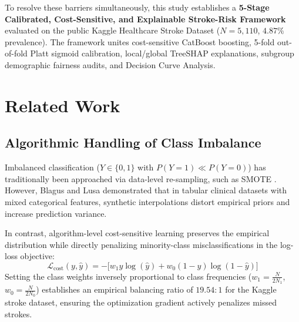 \documentclass[conference]{IEEEtran}
\begin{document}
To resolve these barriers simultaneously, this study establishes a \textbf{5-Stage Calibrated, Cost-Sensitive, and Explainable Stroke-Risk Framework} evaluated on the public Kaggle Healthcare Stroke Dataset ($N = 5,110$, $4.87\%$ prevalence). The framework unites cost-sensitive CatBoost boosting, 5-fold out-of-fold Platt sigmoid calibration, local/global TreeSHAP explanations, subgroup demographic fairness audits, and Decision Curve Analysis.

\section{Related Work}

\subsection{Algorithmic Handling of Class Imbalance}
Imbalanced classification ($Y \in \{0, 1\}$ with $P(Y=1) \ll P(Y=0)$) has traditionally been approached via data-level re-sampling, such as SMOTE \cite{chawla2002smote}. However, Blagus and Lusa \cite{blagus2013smote} demonstrated that in tabular clinical datasets with mixed categorical features, synthetic interpolations distort empirical priors and increase prediction variance.

In contrast, algorithm-level cost-sensitive learning preserves the empirical distribution while directly penalizing minority-class misclassifications in the log-loss objective:
\begin{equation}
\mathcal{L}_{\text{cost}}(y, \hat{y}) = - \Big[ w_1 y \log(\hat{y}) + w_0 (1 - y) \log(1 - \hat{y}) \Big]
\label{eq:cost_loss}
\end{equation}
Setting the class weights inversely proportional to class frequencies ($w_1 = \frac{N}{2 N_1}$, $w_0 = \frac{N}{2 N_0}$) establishes an empirical balancing ratio of $19.54:1$ for the Kaggle stroke dataset, ensuring the optimization gradient actively penalizes missed strokes.
\end{document}
